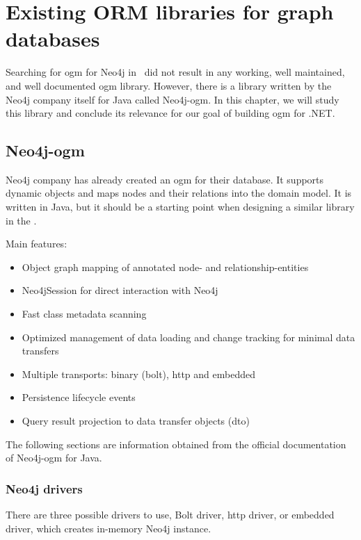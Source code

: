 \chapter {Existing ORM libraries for graph databases}

Searching for \acrshort{ogm} for Neo4j in \CS\ did not result in any working, well maintained, and well documented \acrshort{ogm} library.
However, there is a library written by the Neo4j company itself for Java called Neo4j-\acrshort{ogm}. In this chapter, we will study this library
and conclude its relevance for our goal of building \acrshort{ogm} for .NET.

\section{Neo4j-\acrshort{ogm}}

Neo4j company has already created an \acrshort{ogm} for their database. It supports dynamic objects and maps nodes and their relations into the domain model.
It is written in Java, but it should be a starting point when designing a similar library in the \CS.

\noindent Main features:
\begin{itemize}
    \item Object graph mapping of annotated node- and relationship-entities
    \item Neo4jSession for direct interaction with Neo4j
    \item Fast class metadata scanning
    \item Optimized management of data loading and change tracking for minimal data transfers
    \item Multiple transports: binary (bolt), \acrshort{http} and embedded
    \item Persistence lifecycle events
    \item Query result projection to data transfer objects (\acrshort{dto})
\end{itemize}

The following sections are information obtained from the official documentation of Neo4j-\acrshort{ogm} for Java. \cite{noauthor_reference_nodate}

\subsection {Neo4j drivers}

There are three possible drivers to use, Bolt driver, \acrshort{http} driver, or embedded driver, which creates in-memory Neo4j instance.

